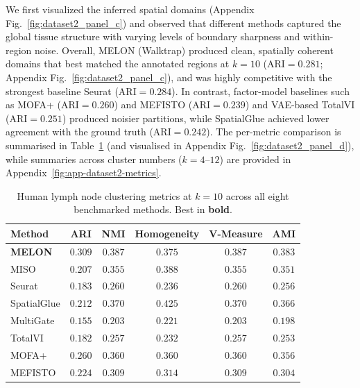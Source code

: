 \documentclass{article}
\theoremstyle{plain}
\theoremstyle{definition}
\begin{document}
We first visualized the inferred spatial domains (Appendix Fig.~\ref{fig:dataset2_panel_c}) and observed that different methods captured the global tissue structure with varying levels of boundary sharpness and within-region noise. Overall, MELON (Walktrap) produced clean, spatially coherent domains that best matched the annotated regions at $k=10$ (ARI$=0.281$; Appendix Fig.~\ref{fig:dataset2_panel_c}), and was highly competitive with the strongest baseline Seurat (ARI$=0.284$). In contrast, factor-model baselines such as MOFA+ (ARI$=0.260$) and MEFISTO (ARI$=0.239$) and VAE-based TotalVI (ARI$=0.251$) produced noisier partitions, while SpatialGlue achieved lower agreement with the ground truth (ARI$=0.242$). The per-metric comparison is summarised in Table~\ref{tab:dataset2_metrics} (and visualised in Appendix Fig.~\ref{fig:dataset2_panel_d}), while summaries across cluster numbers ($k=4$--$12$) are provided in Appendix~\ref{fig:app-dataset2-metrics}.

\begin{table}[!htbp]
\centering
\caption{Human lymph node clustering metrics at $k{=}10$ across all eight benchmarked methods. Best in \textbf{bold}.}
\label{tab:dataset2_metrics}
\small
\begin{tabular}{lccccc}
\toprule
Method & ARI & NMI & Homogeneity & V-Measure & AMI \\
\midrule
\textbf{MELON}  & $\mathbf{0.309}$ & $\mathbf{0.387}$ & $0.375$ & $\mathbf{0.387}$ & $\mathbf{0.383}$ \\
MISO            & $0.207$ & $0.355$ & $0.388$ & $0.355$ & $0.351$ \\
Seurat          & $0.183$ & $0.260$ & $0.236$ & $0.260$ & $0.256$ \\
SpatialGlue     & $0.212$ & $0.370$ & $\mathbf{0.425}$ & $0.370$ & $0.366$ \\
MultiGate       & $0.155$ & $0.203$ & $0.221$ & $0.203$ & $0.198$ \\
TotalVI         & $0.182$ & $0.257$ & $0.232$ & $0.257$ & $0.253$ \\
MOFA+           & $0.260$ & $0.360$ & $0.360$ & $0.360$ & $0.356$ \\
MEFISTO         & $0.224$ & $0.309$ & $0.314$ & $0.309$ & $0.304$ \\
\bottomrule
\end{tabular}
\end{table}
\end{document}

